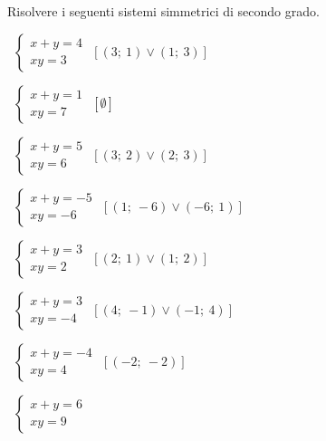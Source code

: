 
\begin{esercizio}[\Ast]
 \label{ese:6.14}
Risolvere i seguenti sistemi simmetrici di secondo grado.
\begin{multicols}{2}
 \begin{enumeratea}
 \item~$\left\{\begin{array}{l}x+y=4\\{xy}=3\end{array}\right.$
  \hfill$\left[(3;~1)\vee(1;~3)\right]$
 \item~$\left\{\begin{array}{l}x+y=1\\{xy}=7 \end{array}\right.$
  \hfill$\left[\emptyset\right]$
 \item~$\left\{\begin{array}{l}x+y=5\\{xy}=6 \end{array}\right.$
  \hfill$\left[(3;~2)\vee(2;~3)\right]$
 \item~$\left\{\begin{array}{l}x+y=-5\\{xy}=-6 \end{array}\right.$
  \hfill$\left[(1;~-6)\vee(-6;~1)\right]$
 \item~$\left\{\begin{array}{l}x+y=3\\{xy}=2 \end{array}\right.$
  \hfill$\left[(2;~1)\vee(1;~2)\right]$
 \item~$\left\{\begin{array}{l}x+y=3\\{xy}=-4\end{array}\right.$
  \hfill$\left[(4;~-1)\vee(-1;~4)\right]$
 \item~$\left\{\begin{array}{l}x+y=-4\\{xy}=4 \end{array}\right.$
  \hfill$\left[(-2;~-2)\right]$
 \item~$\left\{\begin{array}{l}x+y=6\\{xy}=9 \end{array}\right.$

\end{enumeratea}
\end{multicols}
\end{esercizio}
